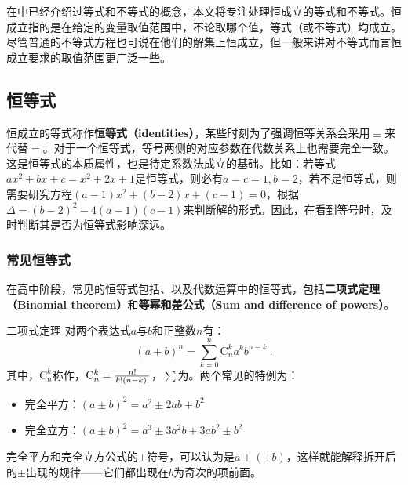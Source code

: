 

在中已经介绍过等式和不等式的概念，本文将专注处理恒成立的等式和不等式。恒成立指的是在给定的变量取值范围中，不论取哪个值，等式（或不等式）均成立。尽管普通的不等式方程也可说在他们的解集上恒成立，但一般来讲对不等式而言恒成立要求的取值范围更广泛一些。

\subsection{恒等式}\label{sub_HsIden_1}

恒成立的等式称作\textbf{恒等式（identities）}，某些时刻为了强调恒等关系会采用$\equiv$来代替$=$。对于一个恒等式，等号两侧的对应参数在代数关系上也需要完全一致。这是恒等式的本质属性，也是待定系数法成立的基础。比如：若等式$ax^2+bx+c=x^2+2x+1$是恒等式，则必有$a=c=1,b=2$，若不是恒等式，则需要研究方程$(a-1)x^2+(b-2)x+(c-1)=0$，根据$\Delta=(b-2)^2-4(a-1)(c-1)$来判断解的形式。因此，在看到等号时，及时判断其是否为恒等式影响深远。

\subsubsection{常见恒等式}

在高中阶段，常见的恒等式包括、以及代数运算中的恒等式，包括\textbf{二项式定理（Binomial theorem）}和\textbf{等幂和差公式（Sum and difference of powers）}。

\begin{theorem}{二项式定理}
对两个表达式$a$与$b$和正整数$n$有：
\begin{equation}
\displaystyle(a+b)^n=\sum_{k=0}^n{\mathrm C}_n^ka^kb^{n-k}~.
\end{equation}
其中，${\mathrm C}_n^k$称作，${\mathrm C}_n^k={n!\over k!(n-k)!}$，$\sum$为。两个常见的特例为：
\begin{itemize}
\item 完全平方：$(a\pm b)^2=a^2\pm2ab+b^2$
\item 完全立方：$(a\pm b)^2=a^3\pm 3a^2b+3ab^2\pm b^2$
\end{itemize}
\end{theorem}

完全平方和完全立方公式的$\pm$符号，可以认为是$a+(\pm b)$，这样就能解释拆开后的$\pm$出现的规律——它们都出现在$b$为奇次的项前面。

